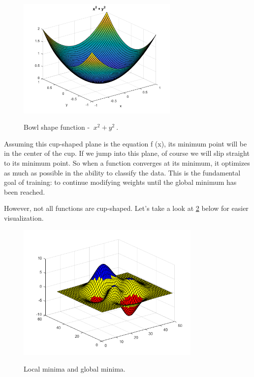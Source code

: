	\begin{figure}[H]
		\centering
		{\includegraphics[width=0.7\textwidth]{./hinhanh/chap3/bowl_shape.png}}
		\caption[bowl]{Bowl shape function - $ \ {x^2} + {y^2} \ $.}
		\label{fig:bowl_shape}
	\end{figure}
	
	Assuming this cup-shaped plane is the equation f (x), its minimum point will be in the center of the cup. If we jump into this plane, of course we will slip straight to its minimum point. So when a function converges at its minimum, it optimizes as much as possible in the ability to classify the data. This is the fundamental goal of training: to continue modifying weights until the global minimum has been reached.
	
	However, not all functions are cup-shaped. Let's take a look at \ref{fig:global} below for easier visualization.
	
	\begin{figure}[H]
		\centering
		{\includegraphics[width=0.8\textwidth]{./hinhanh/chap3/global.png}}
		\caption{Local minima and global minima.}
		\label{fig:global}
	\end{figure}
	
